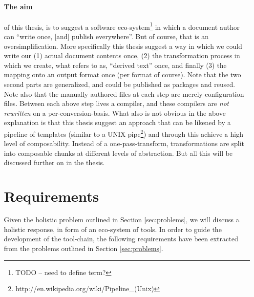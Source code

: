 \documentclass{scrreprt}
\begin{document}
\paragraph{The aim} of this thesis, is to suggest a software eco-system\footnote{TODO -- need to define term?} in which a document author can ``write once, [and] publish everywhere''. But of course, that is an oversimplification. More specifically this thesis suggest a way in which we could write our (1) actual document contents once, (2) the transformation process in which we create, what \citet{reid} refers to as, ``derived text'' once, and finally (3) the mapping onto an output format once (per format of course). Note that the two second parts are generalized, and could be published as packages and reused. Note also that the manually authored files at each step are merely configuration files. Between each above step lives a compiler, and these compilers are \emph{not rewritten} on a per-conversion-basis. What also is not obvious in the above explanation is that this thesis suggest an approach that can be likened by a pipeline of templates (similar to a UNIX pipe\footnote{http://en.wikipedia.org/wiki/Pipeline\_(Unix)}) and through this achieve a high level of composability. Instead of a one-pass-transform, transformations are split into composable chunks at different levels of abstraction. But all this will be discussed further on in the thesis.









\section{Requirements}
Given the holistic problem outlined in Section \ref{sec:problems}, we will discuss a holistic response, in form of an eco-system of tools. In order to guide the development of the tool-chain, the following requirements have been extracted from the problems outlined in Section \ref{sec:problems}.
\end{document}
